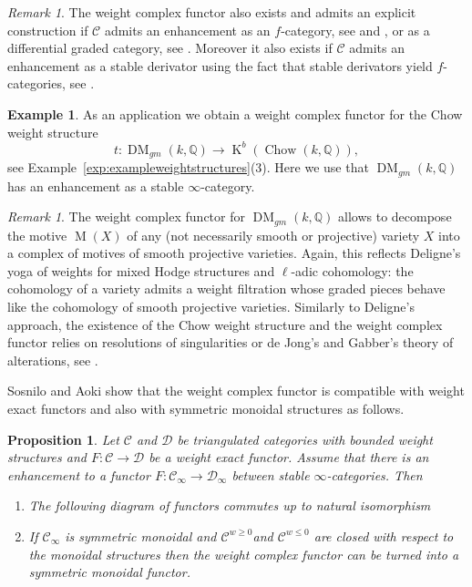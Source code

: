 \documentclass{amsart}
\theoremstyle{plain}
\newtheorem{proposition}[theorem]{Proposition}
\theoremstyle{TheoremNum}
\theoremstyle{definition}
\newtheorem{example}[theorem]{Example}
\theoremstyle{remark}
\newtheorem{remark}[theorem]{Remark}
\numberwithin{equation}{section}
\newcommand{\Q}{\mathbb{Q}}
\newcommand{\Cc}{\mathcal{C}}
\newcommand{\Dd}{\mathcal{D}}
\newcommand{\Ccc}{\mathcal{C}_{\infty}}
\newcommand{\Ddd}{\mathcal{D}_{\infty}}
\newcommand{\Mot}{\operatorname{M}}
\newcommand{\DM}{\operatorname{DM}}
\newcommand{\K}{\operatorname{K}}
\begin{document}
\begin{remark}\label{rem:enhancements}
The weight complex functor also exists and admits an explicit construction if $\Cc$ admits an enhancement as an $f$-category, see \cite{bondarko_weight_2010} and \cite{schnurer_homotopy_2011}, or as a differential graded category, see  \cite{bondarko_differential_2009}. Moreover it also exists  if $\Cc$ admits an enhancement as a stable derivator using the fact that stable derivators yield $f$-categories, see \cite{modoi_reasonable_2019}.
\end{remark}
\begin{example} As an application we obtain a weight complex functor for the Chow weight structure
$$t:\DM_{gm}(k,\Q)\to\K^b(\operatorname{Chow}(k,\Q)),$$
see Example~\ref{exp:exampleweightstructures}(3). Here we use that $\DM_{gm}(k,\Q)$ has an enhancement as a stable $\infty$-category.
\end{example}
\begin{remark}
The weight complex functor for $\DM_{gm}(k,\Q)$ allows to decompose the motive $\Mot(X)$ of any (not necessarily smooth or projective) variety $X$ into a complex of motives of smooth projective varieties. Again, this reflects Deligne's yoga of weights for mixed Hodge structures and $\ell$-adic cohomology: the cohomology of a variety admits a weight filtration whose graded pieces behave like the cohomology of smooth projective varieties.
Similarly to Deligne's approach, the existence of the Chow weight structure and the weight complex functor relies on resolutions of singularities or de Jong's and Gabber's theory of alterations, see \cite{bondarko_1p-motivic_2011}.
\end{remark}
Sosnilo \cite[Corollary 3.5]{sosnilo_theorem_2017} and Aoki \cite[Theorem 4.3]{aoki_weight_2020} show that the weight complex functor is compatible with weight exact functors and also with symmetric monoidal structures as follows.
\begin{proposition}\label{prop:weightcomplexcommute}
Let $\Cc$ and $\Dd$ be triangulated categories with bounded weight structures and $F:\Cc\to\Dd$ be a weight exact functor. Assume that there is an enhancement to a functor $F: \Ccc\to \Ddd$ between stable $\infty$-categories. Then
\begin{enumerate}
    \item The following diagram of functors commutes up to natural isomorphism
\begin{center}
\end{center}
\item  If $\Ccc$ is symmetric monoidal and $\Cc^{w\geq 0}$and $\Cc^{w\leq 0}$ are closed with respect to the monoidal structures then the weight complex functor can be turned into a symmetric monoidal functor.
\end{enumerate}
\end{proposition}
\end{document}
